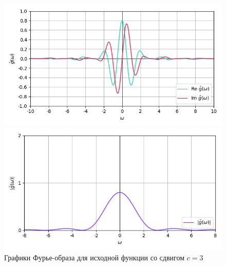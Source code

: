 \documentclass[a4paper]{article}
\begin{document}
\begin{figure}[H]
    \begin{minipage}{0.5\textwidth}
        \centering \includegraphics[width=\textwidth]{sources/6_complex/fourier_3.png}
    \end{minipage}\hfill
    \begin{minipage}{0.5\textwidth}
        \centering \includegraphics[width=\textwidth]{sources/6_complex/abs_3.png}
    \end{minipage}
    \caption{Графики Фурье-образа для исходной функции со сдвигом $c = 3$} 
\end{figure}
\end{document}
